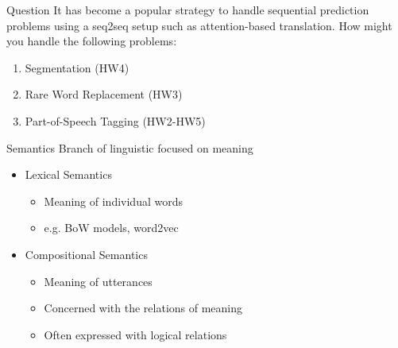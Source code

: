\documentclass{beamer}
\begin{document}







\begin{frame}{Question}
  It has become a popular strategy to handle 
  sequential prediction problems using a seq2seq setup
  such as attention-based translation. How might you 
  handle the following problems: 
  \air 

  \begin{enumerate}
  \item Segmentation (HW4)
    \air 

  \item Rare Word Replacement (HW3)
    \air 

  \item Part-of-Speech Tagging (HW2-HW5)
  \end{enumerate}
\end{frame}

\begin{frame}{Semantics}
  Branch of linguistic focused on meaning
  \air 

  \begin{itemize}
  \item Lexical Semantics
    \begin{itemize}
    \item Meaning of individual words
    \item e.g. BoW models, word2vec
    \end{itemize}
    \air 

  \item Compositional Semantics
    \begin{itemize}
    \item Meaning of utterances
    \item Concerned with the relations of meaning   
    \item Often expressed with logical relations
    \end{itemize}
  \end{itemize}
\end{frame}
\end{document}

